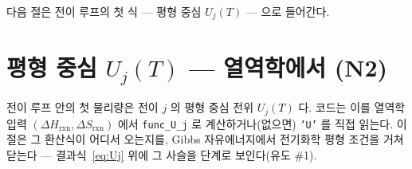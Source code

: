 \documentclass[11pt,a4paper]{article}
\newcommand{\rxn}{\mathrm{rxn}}
\newcommand{\code}[1]{\texttt{#1}}
\begin{document}
다음 절은 전이 루프의 첫 식 --- 평형 중심 $U_j(T)$ --- 으로 들어간다.

\section{평형 중심 $U_j(T)$ — 열역학에서 (N2)}\label{sec:center}
전이 루프 안의 첫 물리량은 전이 $j$ 의 평형 중심 전위 $U_j(T)$ 다. 코드는 이를 열역학 입력 $(\Delta H_\rxn,\Delta S_\rxn)$
에서 \code{func\_U\_j} 로 계산하거나(없으면) \code{'U'} 를 직접 읽는다. 이 절은 그 환산식이 어디서 오는지를, Gibbs
자유에너지에서 전기화학 평형 조건을 거쳐 닫는다 --- 결과식~\eqref{eq:Uj} 위에 그 사슬을 단계로 보인다(유도 \#1).
\end{document}
